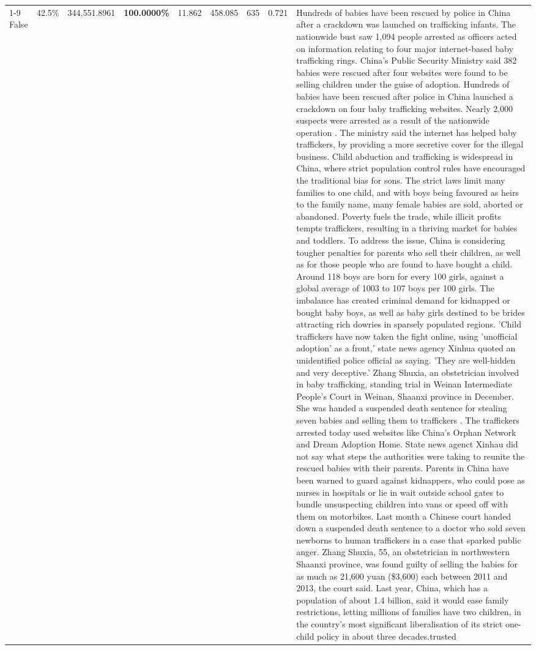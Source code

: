 \begin{table}[H]
\begin{tabular}{lllrlllll}
\cline{1-9}
False & 42.5\% & 344,551.8961 & \bfseries \color{red} 100.0000\% & 11.862 & 458.085 & 635 & 0.721 & Hundreds of babies have been rescued by police in China after a crackdown was launched on trafficking infants. The nationwide bust saw 1,094 people arrested as officers acted on information relating to four major internet-based baby trafficking rings. China's Public Security Ministry said 382 babies were rescued after four websites were found to be selling children under the guise of adoption. Hundreds of babies have been rescued after police in China launched a crackdown on four baby trafficking websites. Nearly 2,000 suspects were arrested as a result of the nationwide operation . The ministry said the internet has helped baby traffickers, by providing a more secretive cover for the illegal business. Child abduction and trafficking is widespread in China, where strict population control rules have encouraged the traditional bias for sons. The strict laws limit many families to one child, and with boys being favoured as heirs to the family name, many female babies are sold, aborted or abandoned. Poverty fuels the trade, while illicit profits tempts traffickers, resulting in a thriving market for babies and toddlers. To address the issue, China is considering tougher penalties for parents who sell their children, as well as for those people who are found to have bought a child. Around 118 boys are born for every 100 girls, against a global average of 1003 to 107 boys per 100 girls. The imbalance has created criminal demand for kidnapped or bought baby boys, as well as baby girls destined to be brides attracting rich dowries in sparsely populated regions. 'Child traffickers have now taken the fight online, using 'unofficial adoption' as a front,' state news agency Xinhua quoted an unidentified police official as saying. 'They are well-hidden and very deceptive.' Zhang Shuxia, an obstetrician involved in baby trafficking, standing trial in Weinan Intermediate People's Court in Weinan, Shaanxi province in December. She was handed a suspended death sentence for stealing seven babies and selling them to traffickers . The traffickers arrested today used websites like China's Orphan Network and Dream Adoption Home. State news agenct Xinhau did not say what steps the authorities were taking to reunite the rescued babies with their parents. Parents in China have been warned to guard against kidnappers, who could pose as nurses in hospitals or lie in wait outside school gates to bundle unsuspecting children into vans or speed off with them on motorbikes. Last month a Chinese court handed down a suspended death sentence to a doctor who sold seven newborns to human traffickers in a case that sparked public anger. Zhang Shuxia, 55, an obstetrician in northwestern Shaanxi province, was found guilty of selling the babies for as much as 21,600 yuan (\$3,600) each between 2011 and 2013, the court said. Last year, China, which has a population of about 1.4 billion, said it would ease family restrictions, letting millions of families have two children, in the country's most significant liberalisation of its strict one-child policy in about three decades.trusted \\

\end{tabular}
\end{table}
